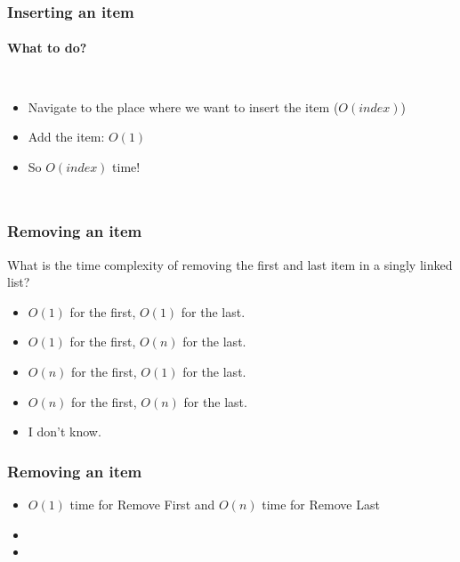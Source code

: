 \begin{frame}
	\frametitle{Inserting an item}
	\framesubtitle{What to do?}
	\begin{columns}
	\begin{itemize}
		\item Navigate to the place where we want to insert the item ($O(\textit{index})$)
			
		\item Add the item: $O(1)$
			
		\item So $O(\textit{index})$ time!
	\end{itemize}
			
		
	
			
	\end{columns}
\end{frame}

\begin{frame}
	\frametitle{Removing an item}

		What is the time complexity of removing the first and last item in a singly linked list?

		\begin{itemize}
			\item $O(1)$ for the first, $O(1)$ for the last.
			\item $O(1)$ for the first, $O(n)$ for the last.
			\item $O(n)$ for the first, $O(1)$ for the last.
			\item $O(n)$ for the first, $O(n)$ for the last.
			\item I don't know.
		\end{itemize}


\end{frame}

\begin{frame}
	\frametitle{Removing an item}


		\begin{itemize}
			\item $O(1)$ time for Remove First and $O(n)$ time for Remove Last

			\item 


		
			\item 
		


		\end{itemize}

\end{frame}

